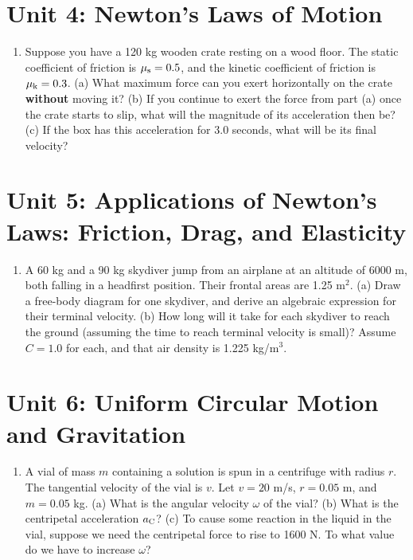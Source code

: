 \documentclass[10pt]{article}
\begin{document}
\section{Unit 4: Newton's Laws of Motion}
\begin{enumerate}
\item Suppose you have a 120 kg wooden crate resting on a wood floor.  The static coefficient of friction is $\mu_{\rm s} = 0.5$, and the kinetic coefficient of friction is $\mu_{\rm k} = 0.3$.  (a) What maximum force can you exert horizontally on the crate \textbf{without} moving it?  (b) If you continue to exert the force from part (a) once the crate starts to slip, what will the magnitude of its acceleration then be?  (c) If the box has this acceleration for 3.0 seconds, what will be its final velocity? \\ \vspace{3cm}
\end{enumerate}

\section{Unit 5: Applications  of Newton's Laws: Friction, Drag, and Elasticity}
\begin{enumerate}
\item A 60 kg and a 90 kg skydiver jump from an airplane at an altitude of 6000 m, both falling in a headfirst position.  Their frontal areas are 1.25 m$^2$.  (a) Draw a free-body diagram for one skydiver, and derive an algebraic expression for their terminal velocity. (b) How long will it take for each skydiver to reach the ground (assuming the time to reach terminal velocity is small)?  Assume $C = 1.0$ for each, and that air density is 1.225 kg/m$^3$. \\ \vspace{2.75cm}
\end{enumerate}

\section{Unit 6: Uniform Circular Motion and Gravitation}
\begin{enumerate}
\item A vial of mass $m$ containing a solution is spun in a centrifuge with radius $r$.  The tangential velocity of the vial is $v$.  Let $v = 20$ m/s, $r = 0.05$ m, and $m = 0.05$ kg. (a) What is the angular velocity $\omega$ of the vial? (b) What is the centripetal acceleration $a_{\rm C}$?  (c) To cause some reaction in the liquid in the vial, suppose we need the centripetal force to rise to 1600 N.  To what value do we have to increase $\omega$? \\ \vspace{3cm}
\end{enumerate}
\end{document}
